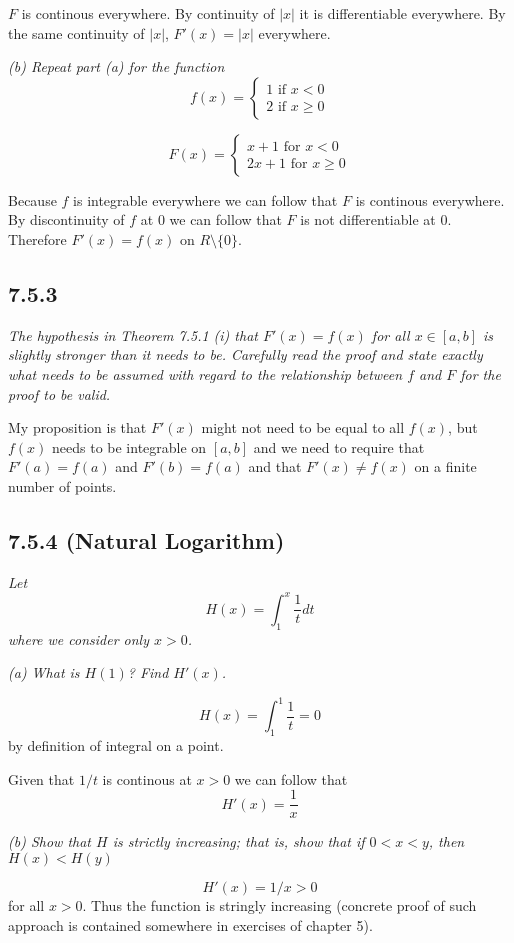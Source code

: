 \documentclass[11pt,oneside,titlepage]{book}
\begin{document}
$F$ is continous everywhere. By continuity of $|x|$ it is differentiable
everywhere. By the same continuity of $|x|$, $F'(x) = |x|$ everywhere.

\textit{(b) Repeat part (a) for the function }
$$ f(x) =
\begin{cases}
  1 \text{ if } x < 0 \\
  2 \text{ if } x \geq 0
\end{cases}
$$

$$F(x) =
\begin{cases}
  x + 1  \text{ for } x < 0 \\
  2x + 1 \text{ for } x \geq 0
\end{cases}
$$

Because $f$ is integrable everywhere we can follow that $F$ is continous
everywhere. By discontinuity of $f$ at $0$ we can follow that $F$ is not
differentiable at $0$. Therefore $F'(x) = f(x)$ on $R \setminus \{0\}$.

\subsection*{7.5.3}
\textit{The hypothesis in Theorem 7.5.1 (i) that $F'(x) = f(x)$ for all
  $x \in [a, b]$ is slightly stronger than it needs to be. Carefully read the
  proof and state exactly what needs to be assumed with regard to the
  relationship between $f$ and $F$ for the proof to be valid.}

My proposition is that $F'(x)$ might not need to be equal to all $f(x)$, but
$f(x)$ needs to be integrable on $[a, b]$ and we need to
require that $F'(a) = f(a)$ and $F'(b) = f(a)$ and that $F'(x) \neq f(x)$ on
a finite number of points.

\subsection*{7.5.4 (Natural Logarithm)}
\textit{Let }
$$H(x) = \int_1^x{\frac{1}{t} dt}$$
\textit{where we consider only $x > 0$.}

\textit{(a) What is $H(1)$? Find $H'(x)$.}

$$H(x) = \int_1^1{\frac{1}{t}} = 0$$
by definition of integral on a point.

Given that $1/t$ is continous at $x > 0$ we can follow that 
$$H'(x) = \frac{1}{x}$$

\textit{(b) Show that $H$ is strictly increasing; that is, show that if
  $0 < x < y$, then $H(x) < H(y)$}

$$H'(x) = 1/x > 0$$
for all $x > 0$. Thus the function is stringly increasing (concrete proof of
such approach is contained somewhere in exercises of chapter 5).
\end{document}
